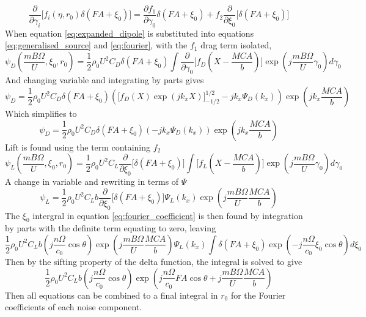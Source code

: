 \documentclass[8pt]{article}
\begin{document}
\begin{equation}
    \frac{\partial}{\partial \gamma_i} \Big[ f_i(\eta, r_0) \delta(FA + \xi_0) \Big] = \frac{\partial f_1}{\partial \gamma_0} \delta(FA + \xi_0) + f_2 \frac{\partial}{\partial \xi_0} \Big[ \delta(FA + \xi_0) \Big]
    \label{eq:expanded_dipole}
\end{equation}
When equation \ref{eq:expanded_dipole} is substituted into equations \ref{eq:generalised_source} and \ref{eq:fourier}, with the $f_1$ drag term isolated,
\begin{equation}
    \psi_D\left( \frac{mB\Omega}{U}, \xi_0, r_0 \right) = \frac{1}{2} \rho_0 U^2 C_D \delta(FA + \xi_0) \int \frac{\partial }{\partial \gamma_0} \Big[ f_D\left(X-\frac{MCA}{b}\right) \Big] \exp\left( j \frac{mB\Omega}{U} \gamma_0 \right) d\gamma_0
\end{equation}
And changing variable and integrating by parts gives
\begin{equation}
    \psi_D = \frac{1}{2} \rho_0 U^2 C_D \delta(FA + \xi_0) \left( \Big[ f_D\left(X\right) \exp(jk_xX) \Big]_{-1/2}^{1/2} - jk_x \Psi_D(k_x) \right) \exp\left( j k_x \frac{MCA}{b} \right)
\end{equation}
Which simplifies to 
\begin{equation}
    \psi_D = \frac{1}{2} \rho_0 U^2 C_D \delta(FA + \xi_0) (-jk_x \Psi_D(k_x)) \exp\left( j k_x \frac{MCA}{b} \right)
\end{equation}
Lift is found using the term containing $f_2$
\begin{equation}
    \psi_L\left( \frac{mB\Omega}{U}, \xi_0, r_0  \right) = \frac{1}{2} \rho_0 U^2 C_L \frac{\partial }{\partial \xi_0} \Big[ \delta(FA + \xi_0) \Big] \int \Big[  f_L\left(X-\frac{MCA}{b}\right) \Big] \exp\left( j \frac{mB\Omega}{U} \gamma_0 \right) d\gamma_0
\end{equation}
A change in variable and rewriting in terms of $\Psi$
\begin{equation}
    \psi_L = \frac{1}{2} \rho_0 U^2 C_L b \frac{\partial }{\partial \xi_0} \Big[ \delta(FA + \xi_0) \Big] \Psi_L (k_x) \exp\left( j \frac{mB\Omega}{U} \frac{MCA}{b} \right)
\end{equation}
The $\xi_0$ intergral in equation \ref{eq:fourier_coefficient} is then found by integration by parts with the definite term equating to zero, leaving
\begin{equation}
    \frac{1}{2} \rho_0 U^2 C_L b \left( j \frac{n\Omega}{c_0}  \cos\theta \right) \exp\left( j \frac{mB\Omega}{U} \frac{MCA}{b} \right) \Psi_L (k_x) \int \delta(FA + \xi_0) \exp\left(-j \frac{n\Omega}{c_0}  \xi_0 \cos\theta\right) d\xi_0
\end{equation}
Then by the sifting property of the delta function, the integral is solved to give
\begin{equation}
    \frac{1}{2} \rho_0 U^2 C_L b \left( j \frac{n\Omega}{c_0}  \cos\theta \right) \exp\left(j \frac{n\Omega}{c_0}  FA \cos\theta + j \frac{mB\Omega}{U} \frac{MCA}{b}\right)
\end{equation}
Then all equations can be combined to a final integral in $r_0$ for the Fourier coefficients of each noise component.
\end{document}
